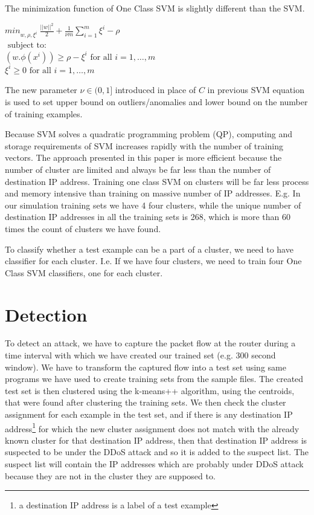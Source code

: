\documentclass[12pt,oneside,a4paper]{article}
\begin{document}
The minimization function of One Class SVM is slightly different than the SVM. \cite{svm}

\begin{center}
  ${min}_{w,\rho,\xi^i} \ \frac{||w||^2}{2} + \frac{1}{\nu m} \sum_{i=1}^m \xi^i - \rho$ \\
  $\mbox{ subject to: }$ \\
  $(w.\phi(x^i)) \geq \rho - \xi^i \mbox{ for all } i = 1, \dots, m$ \\
  \hspace{2cm} $\xi^i \geq 0 \mbox{ for all } i = 1, \dots, m$ \\
\end{center}

The new parameter $\nu \in (0,1]$ introduced in place of $C$ in previous SVM equation is used to set upper bound on outliers/anomalies and lower bound on the number of training examples.

Because SVM solves a quadratic programming problem (QP), computing and storage requirements of SVM increases rapidly with the number of training vectors. The approach presented in this paper is more efficient because the number of cluster are limited and always be far less than the number of destination IP address. Training one class SVM on clusters will be far less process and memory intensive than training on massive number of IP addresses. E.g. In our simulation training sets we have 4 four clusters, while the unique number of destination IP addresses in all the training sets is 268, which is more than 60 times the count of clusters we have found.

To classify whether a test example can be a part of a cluster, we need to have classifier for each cluster. I.e. If we have four clusters, we need to train four One Class SVM classifiers, one for each cluster.
\pagebreak
\section{Detection} \label{sec:Detection}

To detect an attack, we have to capture the packet flow at the router during a time interval with which we have created our trained set (e.g. 300 second window). We have to transform the captured flow into a test set using same programs we have used to create training sets from the sample files. The created test set is then clustered using the k-means++ algorithm, using the centroids, that were found after clustering the training sets. We then check the cluster assignment for each example in the test set, and if there is any destination IP address\footnote{a destination IP address is a label of a test example} for which the new cluster assignment does not match with the already known cluster for that destination IP address, then that destination IP address is suspected to be under the DDoS attack and so it is added to the suspect list. The suspect list will contain the IP addresses which are probably under DDoS attack because they are not in the cluster they are supposed to.
\end{document}
